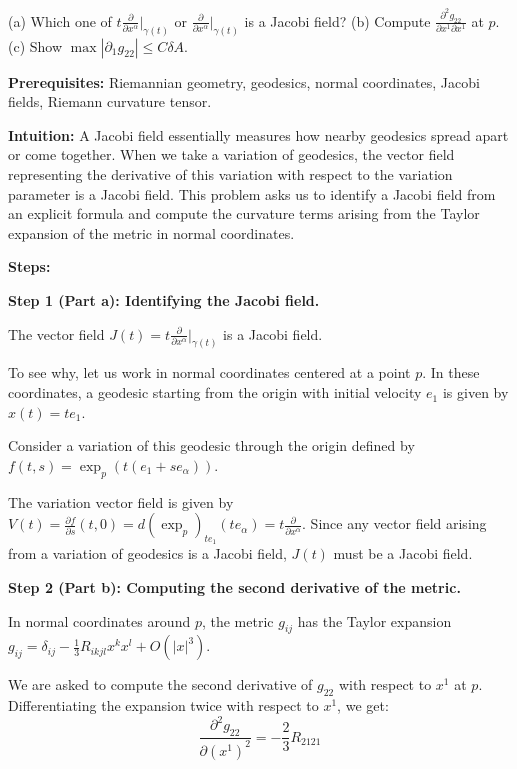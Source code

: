 \begin{exercise}
\label{geometry:2020:3}
(a) Which one of $t\frac{\partial}{\partial x^{\alpha}}\big|_{\gamma(t)}$ or $\frac{\partial}{\partial x^{\alpha}}\big|_{\gamma(t)}$ is a Jacobi field? 
(b) Compute $\frac{\partial^{2} g_{22}}{\partial x^{1} \partial x^{1}}$ at $p$.
(c) Show $\max | \partial_1 g_{22} | \leq C \delta A$.
\end{exercise}

\begin{solution}
\textbf{Prerequisites:} Riemannian geometry, geodesics, normal coordinates, Jacobi fields, Riemann curvature tensor.

\textbf{Intuition:} A Jacobi field essentially measures how nearby geodesics spread apart or come together. When we take a variation of geodesics, the vector field representing the derivative of this variation with respect to the variation parameter is a Jacobi field. This problem asks us to identify a Jacobi field from an explicit formula and compute the curvature terms arising from the Taylor expansion of the metric in normal coordinates.

\textbf{Steps:}

\textbf{Step 1 (Part a): Identifying the Jacobi field.}

The vector field $J(t) = t \frac{\partial}{\partial x^\alpha} \big|_{\gamma(t)}$ is a Jacobi field.

To see why, let us work in normal coordinates centered at a point $p$. In these coordinates, a geodesic starting from the origin with initial velocity $e_1$ is given by $x(t) = t e_1$.

Consider a variation of this geodesic through the origin defined by $f(t, s) = \exp_p(t(e_1 + s e_\alpha))$.

The variation vector field is given by $V(t) = \frac{\partial f}{\partial s}(t, 0) = d(\exp_p)_{t e_1} (t e_\alpha) = t \frac{\partial}{\partial x^\alpha}$. Since any vector field arising from a variation of geodesics is a Jacobi field, $J(t)$ must be a Jacobi field.

\textbf{Step 2 (Part b): Computing the second derivative of the metric.}

In normal coordinates around $p$, the metric $g_{ij}$ has the Taylor expansion $g_{ij} = \delta_{ij} - \frac{1}{3} R_{ikjl} x^k x^l + O(|x|^3)$.

We are asked to compute the second derivative of $g_{22}$ with respect to $x^1$ at $p$. Differentiating the expansion twice with respect to $x^1$, we get:
\[ \frac{\partial^2 g_{22}}{\partial (x^1)^2} = -\frac{2}{3} R_{2121} \]


\end{solution}
